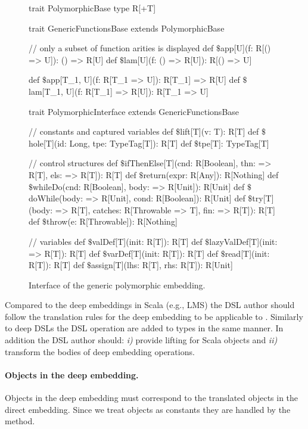 \begin{figure}
\begin{listingtiny}
trait PolymorphicBase { type R[+T] }

trait GenericFunctionsBase extends PolymorphicBase {
  // only a subset of function arities is displayed
  def $\$$app[U](f: R[() => U]): () => R[U]
  def $\$$lam[U](f: () => R[U]): R[() => U]

  def $\$$app[T_1, U](f: R[T_1 => U]): R[T_1] => R[U]
  def $\$$lam[T_1, U](f: R[T_1] => R[U]): R[T_1 => U]
}

trait PolymorphicInterface extends GenericFunctionsBase {
  // constants and captured variables
  def $\$$lift[T](v: T): R[T]
  def $\$$hole[T](id: Long, tpe: TypeTag[T]): R[T]
  def $\$$tpe[T]: TypeTag[T]

  // control structures
  def $\$$ifThenElse[T](cnd: R[Boolean], thn: => R[T], els: => R[T]): R[T]
  def $\$$return(expr: R[Any]): R[Nothing]
  def $\$$whileDo(cnd: R[Boolean], body: => R[Unit]): R[Unit]
  def $\$$doWhile(body: => R[Unit], cond: R[Boolean]): R[Unit]
  def $\$$try[T](body: => R[T], catches: R[Throwable => T], fin: => R[T]): R[T]
  def $\$$throw(e: R[Throwable]): R[Nothing]

  // variables
  def $\$$valDef[T](init: R[T]): R[T]
  def $\$$lazyValDef[T](init: => R[T]): R[T]
  def $\$$varDef[T](init: R[T]): R[T]
  def $\$$read[T](init: R[T]): R[T]
  def $\$$assign[T](lhs: R[T], rhs: R[T]): R[Unit]
}
\end{listingtiny}
\caption{Interface of the generic polymorphic embedding.}
\label{fig:polymorphic-embedding}
\end{figure}

Compared to the deep embeddings in Scala (e.g., LMS) the DSL author should follow the
translation rules for the deep embedding to be applicable to \yy. Similarly to deep DSLs the
DSL operation are added to  types in the same manner. In addition the DSL author should:
\emph{i)} provide lifting for Scala objects and \emph{ii)} transform the bodies of deep embedding operations.

\paragraph{Objects in the deep embedding.} Objects in the deep embedding must correspond to the
translated objects in the direct embedding. Since we treat objects as constants
they are handled by the  method.

